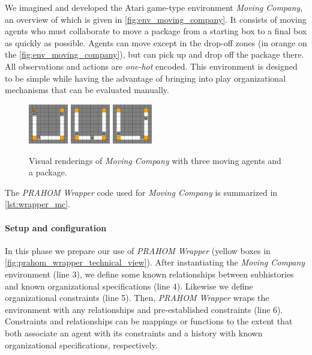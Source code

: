 \documentclass{ecai}
\newcounter{relation}
\begin{document}
We imagined and developed the Atari game-type environment \emph{Moving Company}, an overview of which is given in \autoref{fig:env_moving_company}.
It consists of moving agents who must collaborate to move a package from a starting box to a final box as quickly as possible. Agents can move except in the drop-off zones (in orange on the \autoref{fig:env_moving_company}), but can pick up and drop off the package there. All observations and actions are \emph{one-hot} encoded. This environment is designed to be simple while having the advantage of bringing into play organizational mechanisms that can be evaluated manually.
%
\begin{figure}[h!]
\centering
\includegraphics[width=0.154\textwidth]{figures/moving_company_1.png}
\includegraphics[width=0.154\textwidth]{figures/moving_company_2.png}
\includegraphics[width=0.154\textwidth]{figures/moving_company_3.png}
\caption{Visual renderings of \emph{Moving Company} with three moving agents and a package.}
\label{fig:env_moving_company}
\end{figure}
%
The \emph{PRAHOM Wrapper} code used for \emph{Moving Company} is summarized in \autoref{lst:wrapper_mc}.

\paragraph{Setup and configuration}

In this phase we prepare our use of \emph{PRAHOM Wrapper} (yellow boxes in \autoref{fig:prahom_wrapper_technical_view}).
After instantiating the \emph{Moving Company} environment (line 3), we define some known relationships between subhistories and known organizational specifications (line 4). Likewise we define organizational constraints (line 5). Then, \emph{PRAHOM Wrapper} wraps the environment with any relationships and pre-established constraints (line 6). Constraints and relationships can be mappings or functions to the extent that both associate an agent with its constraints and a history with known organizational specifications, respectively.
\end{document}
